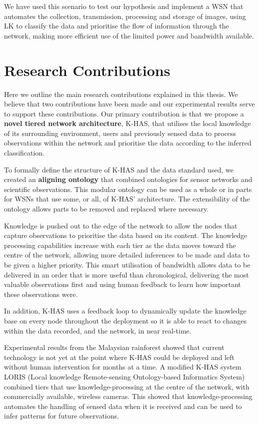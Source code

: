 We have used this scenario to test our hypothesis and implement a WSN that automates the collection, transmission, processing and storage of images, using LK to classify the data and prioritise the flow of information through the network, making more efficient use of the limited power and bandwidth available. 

\section{Research Contributions}

Here we outline the main research contributions explained in this thesis. We believe that two contributions have been made and our experimental results serve to support these contributions.
Our primary contribution is that we propose a \textbf{novel tiered network architecture}, K-HAS, that utilises the local knowledge of its surrounding environment, users and previously sensed data to process observations within the network and prioritise the data according to the inferred classification. 

To formally define the structure of K-HAS and the data standard used, we created an \textbf{aligning ontology} that combined ontologies for sensor networks and scientific observations. This modular ontology can be used as a whole or in parts for WSNs that use some, or all, of K-HAS' architecture. The extensibility of the ontology allows parts to be removed and replaced where necessary.

Knowledge is pushed out to the edge of the network to allow the nodes that capture observations to prioritise the data based on its content. The knowledge processing capabilities increase with each tier as the data moves toward the centre of the network, allowing more detailed inferences to be made and data to be given a higher priority. This smart utilisation of bandwidth allows data to be delivered in an order that is more useful than chronological, delivering the most valuable observations first and using human feedback to learn how important these observations were. 

In addition, K-HAS uses a feedback loop to dynamically update the knowledge base on every node throughout the deployment so it is able to react to changes within the data recorded, and the network, in near real-time.

Experimental results from the Malaysian rainforest showed that current technology is not yet at the point where K-HAS could be deployed and left without human intervention for months at a time. A modified K-HAS system LORIS (Local knowledge Remote-sensing Ontology-based Informatics System) combined tiers that use knowledge-processing at the centre of the network, with commercially available, wireless cameras. This showed that knowledge-processing automates the handling of sensed data when it is received and can be used to infer patterns for future observations.

